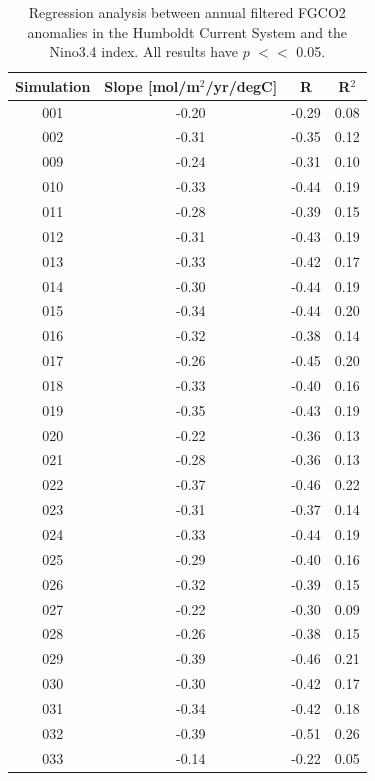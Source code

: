 \documentclass[12pt]{article}
\begin{document}
\newpage
\begin{table}[p!]
	\centering
	\caption{Regression analysis between annual filtered FGCO2 anomalies in the Humboldt Current System and the Nino3.4 index. All results have $p$ $<<$ 0.05.}
	\begin{tabular}{c | c c c}
		\toprule
		\textbf{Simulation} &  \textbf{Slope} [mol/m$^{2}$/yr/degC] &  \textbf{R} &  \textbf{R$^{2}$} \\
		\midrule
		001 &  -0.20 &    -0.29 &       0.08 \\
		002 &  -0.31 &    -0.35 &       0.12 \\
		009 &  -0.24 &    -0.31 &       0.10 \\
		010 &  -0.33 &    -0.44 &       0.19 \\
		011 &  -0.28 &    -0.39 &       0.15 \\
		012 &  -0.31 &    -0.43 &       0.19 \\
		013 &  -0.33 &    -0.42 &       0.17 \\
		014 &  -0.30 &    -0.44 &       0.19 \\
		015 &  -0.34 &    -0.44 &       0.20 \\
		016 &  -0.32 &    -0.38 &       0.14 \\
		017 &  -0.26 &    -0.45 &       0.20 \\
		018 &  -0.33 &    -0.40 &       0.16 \\
		019 &  -0.35 &    -0.43 &       0.19 \\
		020 &  -0.22 &    -0.36 &       0.13 \\
		021 &  -0.28 &    -0.36 &       0.13 \\
		022 &  -0.37 &    -0.46 &       0.22 \\
		023 &  -0.31 &    -0.37 &       0.14 \\
		024 &  -0.33 &    -0.44 &       0.19 \\
		025 &  -0.29 &    -0.40 &       0.16 \\
		026 &  -0.32 &    -0.39 &       0.15 \\
		027 &  -0.22 &    -0.30 &       0.09 \\
		028 &  -0.26 &    -0.38 &       0.15 \\
		029 &  -0.39 &    -0.46 &       0.21 \\
		030 &  -0.30 &    -0.42 &       0.17 \\
		031 &  -0.34 &    -0.42 &       0.18 \\
		032 &  -0.39 &    -0.51 &       0.26 \\
		033 &  -0.14 &    -0.22 &       0.05 \\

\end{tabular}
\end{table}
\end{document}
